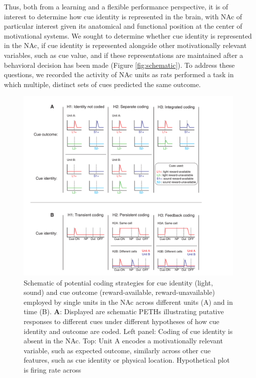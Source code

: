 \documentclass[11pt]{article}
\newcommand{\bsf}[1]{\textbf{#1}}
\begin{document}
Thus, both from a learning and a flexible performance perspective, it
is of interest to determine how cue identity is represented in the
brain, with NAc of particular interest given its anatomical and
functional position at the center of motivational systems. We sought
to determine whether cue identity is represented in the NAc, if cue
identity is represented alongside other motivationally relevant
variables, such as cue value, and if these representations are
maintained after a behavioral decision has been made (Figure
\ref{fig:schematic}). To address these questions, we recorded the
activity of NAc units as rats performed a task in which multiple,
distinct sets of cues predicted the same outcome.


 \begin{figure}[ht!]
\centering
\includegraphics[height=0.7\textheight]{Fig 1 - Schematic neural.pdf}
\caption{Schematic of potential coding strategies for cue identity
  (light, sound) and cue outcome (reward-available,
  reward-unavailable) employed by single units in the NAc across
  different units (A) and in time (B). \bsf{A}: Displayed are
  schematic PETHs illustrating putative responses to different cues
  under different hypotheses of how cue identity and outcome are
  coded. Left panel: Coding of cue identity is absent in the NAc. Top:
  Unit A encodes a motivationally relevant variable, such as expected
  outcome, similarly across other cue features, such as cue identity
  or physical location. Hypothetical plot is firing rate across
}
\end{figure}
\end{document}
